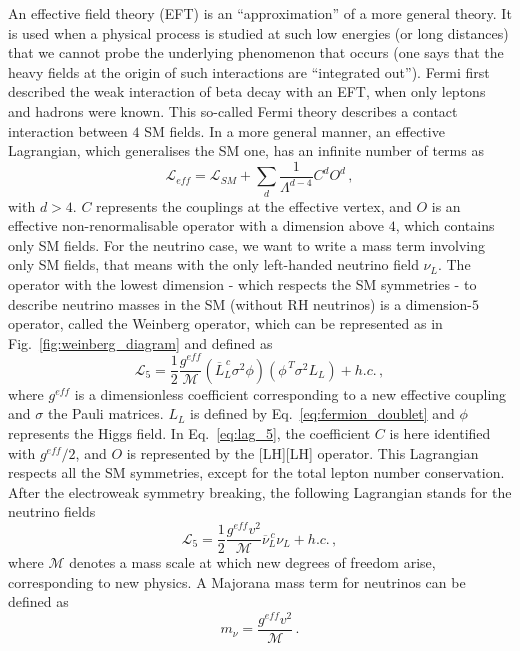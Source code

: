 An effective field theory (EFT) is an ``approximation'' of a more general theory.
It is used when a physical process is studied at such low energies (or long distances) that we cannot probe the underlying phenomenon that occurs (one says that the heavy fields at the origin of such
interactions are ``integrated out'').
Fermi first described the weak interaction of beta decay with an EFT, when only leptons and hadrons were known.
This so-called Fermi theory describes a contact interaction between $4$ SM fields.
In a more general manner, an effective Lagrangian, which generalises the SM one, has an infinite number of terms as
\begin{equation}
  \mathcal{L}_{eff}=\mathcal{L}_{SM}+\sum_{d}\frac{1}{\Lambda^{d-4}}C^{d}O^{d}\,,
\end{equation}
with $d>4$.
$C$ represents the couplings at the effective vertex, and $O$ is an effective non-renormalisable operator with a dimension above $4$, which contains only SM fields.
For the neutrino case, we want to write a mass term involving only SM fields, that means with the only left-handed neutrino field $\nu_L$.
The operator with the lowest dimension - which respects the SM symmetries - to describe neutrino masses in the SM (without RH neutrinos) is a dimension-$5$ operator, called the Weinberg operator, which can be represented as in Fig.~\ref{fig:weinberg_diagram} and defined as
\begin{equation}
  \mathcal{L}_5 = \frac{1}{2}\frac{g^{eff}}{\mathcal{M}}(\overline{L}_{L}^{\,c}\sigma^{2}\phi)(\phi^{\,T}\sigma^{2}L_L)+h.c.\,,
  \label{eq:lag_5}
\end{equation}
where $g^{eff}$ is a dimensionless coefficient corresponding to a new effective coupling and $\sigma$ the Pauli matrices.
$L_L$ is defined by Eq.~\eqref{eq:fermion_doublet} and $\phi$ represents the Higgs field.
In Eq.~\eqref{eq:lag_5}, the coefficient $C$ is here identified with $g^{eff}/2$, and $O$ is represented by the [LH][LH] operator.
This Lagrangian respects all the SM symmetries, except for the total lepton number conservation.
After the electroweak symmetry breaking, the following Lagrangian stands for the neutrino fields
\begin{equation}
  \mathcal{L}_5=\frac{1}{2}\frac{g^{eff}v^{2}}{\mathcal{M}}\overline{\nu}^{\,c}_{L}\nu_{L}+h.c.\,,
\end{equation}
where $\mathcal{M}$ denotes a mass scale at which new degrees of freedom arise, corresponding to new physics.
A Majorana mass term for neutrinos can be defined as
\begin{equation}
m_{\nu}=\frac{g^{eff}v^{2}}{\mathcal{M}}\,.
\label{eq:mass_maj}
\end{equation}
